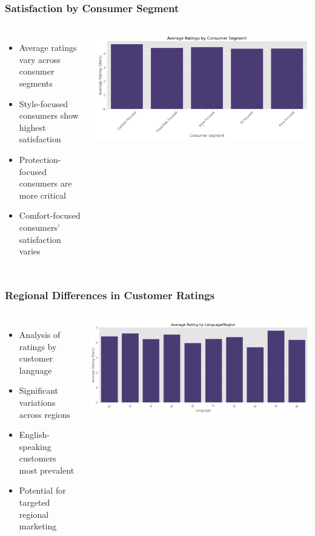 \documentclass[aspectratio=169]{beamer}
\begin{document}
\begin{frame}
\frametitle{Satisfaction by Consumer Segment}
\begin{columns}
\begin{itemize}
    \item Average ratings vary across consumer segments
    \item Style-focused consumers show highest satisfaction
    \item Protection-focused consumers are more critical
    \item Comfort-focused consumers' satisfaction varies
\end{itemize}
\includegraphics[width=\textwidth]{plots/ratings_by_segment.png}
\end{columns}
\end{frame}

\begin{frame}
\frametitle{Regional Differences in Customer Ratings}
\begin{columns}
\begin{itemize}
    \item Analysis of ratings by customer language
    \item Significant variations across regions
    \item English-speaking customers most prevalent
    \item Potential for targeted regional marketing
\end{itemize}
\includegraphics[width=\textwidth]{plots/ratings_by_language.png}
\end{columns}
\end{frame}
\end{document}
